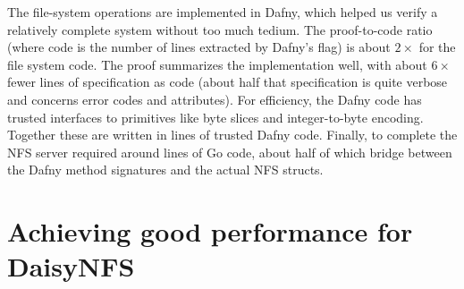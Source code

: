 
The file-system operations are implemented in Dafny, which helped us verify a
relatively complete system without too much tedium. The
proof-to-code ratio (where code is the number of lines extracted by Dafny's
 flag) is about $2\times$ for the file system code.
The proof summarizes the implementation well, with about $6\times$ fewer lines
of specification as code (about half that specification is quite verbose and concerns
error codes and attributes). For efficiency, the Dafny code has trusted interfaces to
primitives like byte slices and integer-to-byte encoding. Together these are
written in \daisyTrustedSpec lines of trusted Dafny code.
Finally, to complete the NFS server required around  lines of Go
code, about half of which bridge between the Dafny method signatures and the
actual NFS structs.

\begin{comment}
begin
    rm -rf src-compiled
    for file in src/*/**.dfy
        set -l path (string sub --start 4 $file)
        set -l dir (dirname $path)
        mkdir -p src-compiled/$dir
        dafny /printMode:NoGhost /dafnyVerify:0 /rprint:src-compiled/$path $file &
    end
    wait
    cloc --read-lang-def ~/dafny-lang.txt src-compiled
    cloc --read-lang-def ~/dafny-lang.txt src
end
\end{comment}



\begin{comment}
begin
    gsed -n '/method[^(]* [A-Z]*(/,/^\s*{/p' src/fs/dir_fs.dfy
    cat src/fs/nfs.s.dfy
end | wc -l
\end{comment}
%


\section{Achieving good performance for DaisyNFS}
\label{sec:impl:dafny-perf}

